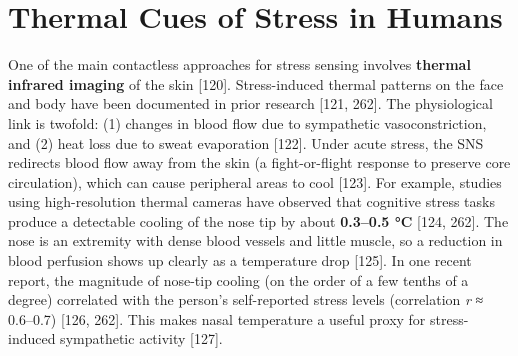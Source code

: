 \documentclass{article}
\begin{document}
    \section{Thermal Cues of Stress in Humans}
    One of the main contactless approaches for stress sensing involves \textbf{thermal infrared imaging} of the skin [120]. Stress-induced thermal patterns on the face and body have been documented in prior research [121, 262]. The physiological link is twofold: (1) changes in blood flow due to sympathetic vasoconstriction, and (2) heat loss due to sweat evaporation [122]. Under acute stress, the SNS redirects blood flow away from the skin (a fight-or-flight response to preserve core circulation), which can cause peripheral areas to cool [123]. For example, studies using high-resolution thermal cameras have observed that cognitive stress tasks produce a detectable cooling of the nose tip by about \textbf{0.3–0.5 °C} [124, 262]. The nose is an extremity with dense blood vessels and little muscle, so a reduction in blood perfusion shows up clearly as a temperature drop [125]. In one recent report, the magnitude of nose-tip cooling (on the order of a few tenths of a degree) correlated with the person’s self-reported stress levels (correlation \textit{r} ≈ 0.6–0.7) [126, 262]. This makes nasal temperature a useful proxy for stress-induced sympathetic activity [127].
\end{document}
